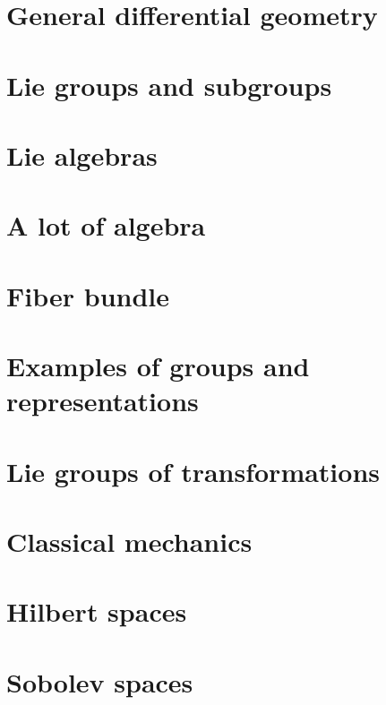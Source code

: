 \documentclass[a4paper,twoside,11pt]{book}
\begin{document}
\chapter{General differential geometry} \label{Chapitre_FB}



\chapter{Lie groups and subgroups}


\chapter{Lie algebras}







\chapter{A lot of algebra}




\chapter{Fiber bundle}



\chapter{Examples of groups and representations}        \label{ChapThoComsGroupes}



\chapter{Lie groups of transformations}


\chapter{Classical mechanics}


\chapter{Hilbert spaces}



\chapter{Sobolev spaces}

\end{document}
